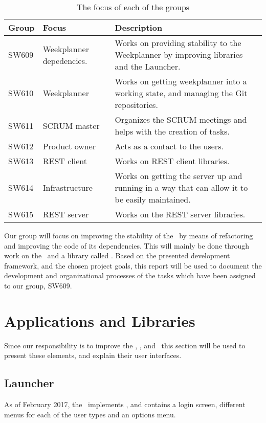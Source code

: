 \begin{table}[H]
\centering
\begin{tabular}{|p{2cm}|p{3cm}|p{8cm}|}
\hline
Group & Focus & Description \\ \hline
SW609 & Weekplanner depedencies. & Works on providing
stability to the Weekplanner by improving libraries and the Launcher.\\\hline 
SW610 & Weekplanner & Works on getting weekplanner into a working
state, and managing the Git repositories.\\\hline 
SW611 & SCRUM master & Organizes the SCRUM meetings and helps with the creation of tasks. \\\hline 
SW612 & Product owner &  Acts as a contact to the users.\\\hline 
SW613 & REST client & Works on REST client libraries.\\ \hline

SW614 & Infrastructure & Works on getting the server up and running in a way
that can allow it to be easily maintained. \\\hline

SW615 & REST server & Works on the REST server libraries.\\ \hline

\end{tabular}
\caption{The focus of each of the groups}
\label{GroupDivision}
\end{table}

Our group will focus on improving the stability of the \wapp\ by means of
refactoring and improving the code of its dependencies. This will mainly be done
through work on the \lapp\ and a library called \plib. Based
on the presented development framework, and the chosen project goals, this
report will be used to document the development and organizational processes of
the tasks which have been assigned to our group, SW609.

\section{Applications and Libraries}
Since our responsibility is to improve the \lapp, \clib, and \plib\ this section
will be used to present these elements, and explain their user interfaces.

\subsection{Launcher}\label{LauncherReview}
As of February 2017, the \lapp\ implements \clib, and contains a login screen,
different menus for each of the user types and an options menu.

